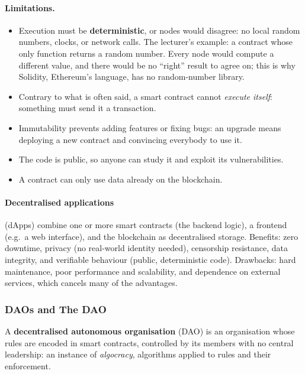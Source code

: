 \paragraph{Limitations.}
\begin{itemize}
    \item Execution must be \textbf{deterministic}, or nodes would disagree: no local random numbers, clocks, or network calls. The lecturer's example: a contract whose only function returns a random number. Every node would compute a different value, and there would be no \enquote{right} result to agree on; this is why Solidity, Ethereum's language, has no random-number library.
    \item Contrary to what is often said, a smart contract cannot \emph{execute itself}: something must send it a transaction.
    \item Immutability prevents adding features or fixing bugs: an upgrade means deploying a new contract and convincing everybody to use it.
    \item The code is public, so anyone can study it and exploit its vulnerabilities.
    \item A contract can only use data already on the blockchain.
\end{itemize}

\paragraph{Decentralised applications} (dApps) combine one or more smart contracts (the backend logic), a frontend (e.g.\ a web interface), and the blockchain as decentralised storage. Benefits: zero downtime, privacy (no real-world identity needed), censorship resistance, data integrity, and verifiable behaviour (public, deterministic code). Drawbacks: hard maintenance, poor performance and scalability, and dependence on external services, which cancels many of the advantages.

\subsubsection{DAOs and The DAO}

A \textbf{decentralised autonomous organisation} (DAO) is an organisation whose rules are encoded in smart contracts, controlled by its members with no central leadership: an instance of \emph{algocracy}, algorithms applied to rules and their enforcement.

